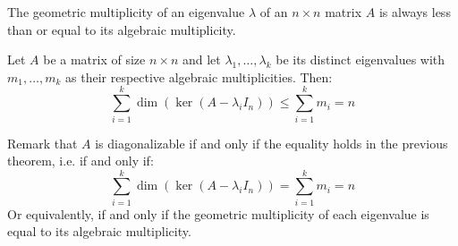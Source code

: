\begin{theorem}
    The geometric multiplicity of an eigenvalue $\lambda$ of an $n \times n$ matrix $A$ is always less than or equal to its algebraic multiplicity.
\end{theorem}

\begin{theorem}
    Let $A$ be a matrix of size $n \times n$ and let $\lambda_1, \ldots, \lambda_k$ be its distinct eigenvalues with $m_1, \ldots, m_k$ as their respective algebraic multiplicities. Then:
    \[
        \sum_{i=1}^k \dim(\ker(A - \lambda_i I_n)) \leq \sum_{i=1}^k m_i = n
    \]
\end{theorem}
Remark that $A$ is diagonalizable if and only if the equality holds in the previous theorem, i.e. if and only if:
\[\sum_{i=1}^k \dim(\ker(A - \lambda_i I_n)) = \sum_{i=1}^k m_i = n\]
Or equivalently, if and only if the geometric multiplicity of each eigenvalue is equal to its algebraic multiplicity.

